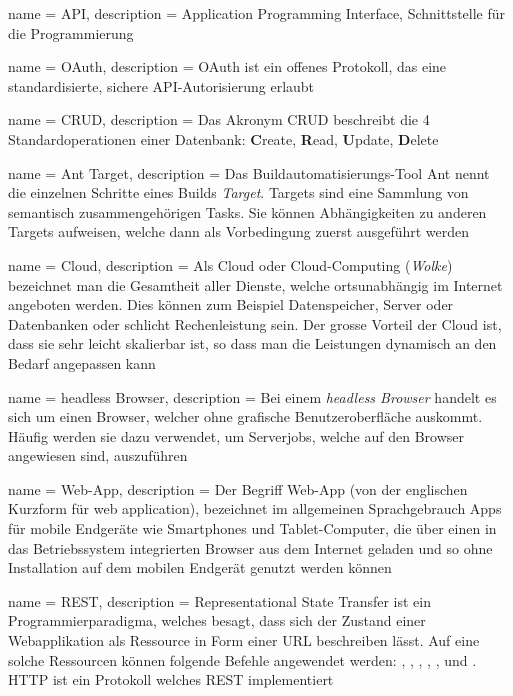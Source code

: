  {
	name = API,
	description = {Application Programming Interface, Schnittstelle für die Programmierung}
}

 {
	name = OAuth,
	description = {OAuth ist ein offenes Protokoll, das eine standardisierte, sichere API-Autorisierung erlaubt\cite{oauth}}
}

 {
	name = CRUD,
	description = {Das Akronym CRUD beschreibt die 4 Standardoperationen einer Datenbank: \textbf{C}reate, \textbf{R}ead, \textbf{U}pdate, \textbf{D}elete\cite{crud}}
}

 {
	name = Ant Target,
	description = {Das Buildautomatisierungs-Tool Ant nennt die einzelnen Schritte eines Builds \emph{Target}. Targets sind eine Sammlung von semantisch zusammengehörigen Tasks. Sie können Abhängigkeiten zu anderen Targets aufweisen, welche dann als Vorbedingung zuerst ausgeführt werden\cite{ant-target}}
}

 {
	name = Cloud,
	description = {Als Cloud oder Cloud-Computing (\emph{Wolke}) bezeichnet man die Gesamtheit aller Dienste, welche ortsunabhängig im Internet angeboten werden. Dies können zum Beispiel Datenspeicher, Server oder Datenbanken oder schlicht Rechenleistung sein. Der grosse Vorteil der Cloud ist, dass sie sehr leicht skalierbar ist, so dass man  die Leistungen dynamisch an den Bedarf angepassen kann\cite{cloud}}
}

 {
	name = headless Browser,
	description = {Bei einem \emph{headless Browser} handelt es sich um einen Browser, welcher ohne grafische Benutzeroberfläche auskommt. Häufig werden sie dazu verwendet, um Serverjobs, welche auf den Browser angewiesen sind, auszuführen}
}

 {
	name = Web-App,
	description = {Der Begriff Web-App (von der englischen Kurzform für web application), bezeichnet im allgemeinen Sprachgebrauch Apps für mobile Endgeräte wie Smartphones und Tablet-Computer, die über einen in das Betriebssystem integrierten Browser aus dem Internet geladen und so ohne Installation auf dem mobilen Endgerät genutzt werden können\cite{webapp}}
}

 {
	name = REST,
	description = {Representational State Transfer\cite{rest} ist ein Programmierparadigma, welches besagt, dass sich der Zustand einer Webapplikation als Ressource in Form einer URL beschreiben lässt. Auf eine solche Ressourcen können folgende Befehle angewendet werden: , , , , ,  und .
	HTTP ist ein Protokoll welches REST implementiert}
}


